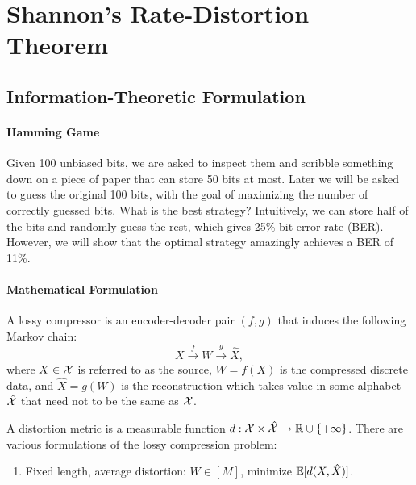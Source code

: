 \section{Shannon's Rate-Distortion Theorem}

\subsection{Information-Theoretic Formulation}
\paragraph{Hamming Game} 
Given 100 unbiased bits, we are asked to inspect them and scribble something down on a piece of paper that can store 50 bits at most.
Later we will be asked to guess the original 100 bits, with the goal of maximizing the number of correctly guessed bits. What is the best strategy?
Intuitively, we can store half of the bits and randomly guess the rest, which gives 25\% bit error rate (BER).
However, we will show that the optimal strategy amazingly achieves a BER of 11\%.

\paragraph{Mathematical Formulation} A lossy compressor is an encoder-decoder pair $(f,g)$ that induces the following Markov chain:
\[X\stackrel{f}{\longrightarrow} W\stackrel{g}{\longrightarrow}\hat{X},\]
where $X\in\mathcal{X}$ is referred to as the source, $W=f(X)$ is the compressed discrete data, and $\hat{X}=g(W)$ is the reconstruction which takes value in some alphabet $\hat{\mathcal{X}}$ that need not to be the same as $\mathcal{X}$.

A distortion metric is a measurable function $d:\mathcal{X}\times\hat{\mathcal{X}}\to\mathbb{R}\cup\{+\infty\}$.
There are various formulations of the lossy compression problem:
\begin{enumerate}
    \item Fixed length, average distortion: $W\in [M]$, minimize $\mathbb{E}[d(X,\hat{X})]$.
\end{enumerate}

